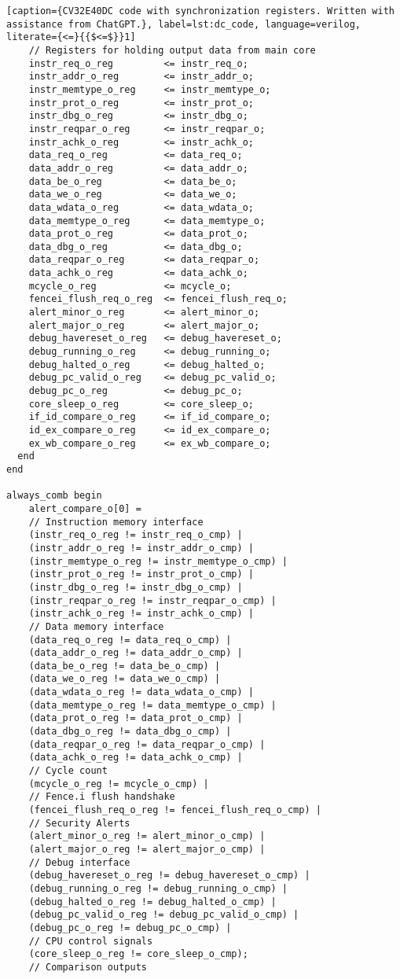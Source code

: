 \begin{lstlisting}[caption={CV32E40DC code with synchronization registers. Written with assistance from ChatGPT.}, label=lst:dc_code, language=verilog, literate={<=}{{$<=$}}1]
    // Registers for holding output data from main core 
    instr_req_o_reg         <= instr_req_o;
    instr_addr_o_reg        <= instr_addr_o;
    instr_memtype_o_reg     <= instr_memtype_o;
    instr_prot_o_reg        <= instr_prot_o;
    instr_dbg_o_reg         <= instr_dbg_o;
    instr_reqpar_o_reg      <= instr_reqpar_o;
    instr_achk_o_reg        <= instr_achk_o;
    data_req_o_reg          <= data_req_o;
    data_addr_o_reg         <= data_addr_o;
    data_be_o_reg           <= data_be_o;
    data_we_o_reg           <= data_we_o;
    data_wdata_o_reg        <= data_wdata_o;
    data_memtype_o_reg      <= data_memtype_o;
    data_prot_o_reg         <= data_prot_o;
    data_dbg_o_reg          <= data_dbg_o;
    data_reqpar_o_reg       <= data_reqpar_o;
    data_achk_o_reg         <= data_achk_o;
    mcycle_o_reg            <= mcycle_o;
    fencei_flush_req_o_reg  <= fencei_flush_req_o;
    alert_minor_o_reg       <= alert_minor_o;
    alert_major_o_reg       <= alert_major_o;
    debug_havereset_o_reg   <= debug_havereset_o;
    debug_running_o_reg     <= debug_running_o;
    debug_halted_o_reg      <= debug_halted_o;
    debug_pc_valid_o_reg    <= debug_pc_valid_o;
    debug_pc_o_reg          <= debug_pc_o;
    core_sleep_o_reg        <= core_sleep_o;
    if_id_compare_o_reg     <= if_id_compare_o;
    id_ex_compare_o_reg     <= id_ex_compare_o;
    ex_wb_compare_o_reg     <= ex_wb_compare_o;
  end 
end

always_comb begin
    alert_compare_o[0] = 
    // Instruction memory interface
    (instr_req_o_reg != instr_req_o_cmp) |
    (instr_addr_o_reg != instr_addr_o_cmp) |
    (instr_memtype_o_reg != instr_memtype_o_cmp) |
    (instr_prot_o_reg != instr_prot_o_cmp) |
    (instr_dbg_o_reg != instr_dbg_o_cmp) |
    (instr_reqpar_o_reg != instr_reqpar_o_cmp) |
    (instr_achk_o_reg != instr_achk_o_cmp) |
    // Data memory interface
    (data_req_o_reg != data_req_o_cmp) |
    (data_addr_o_reg != data_addr_o_cmp) |
    (data_be_o_reg != data_be_o_cmp) |
    (data_we_o_reg != data_we_o_cmp) |
    (data_wdata_o_reg != data_wdata_o_cmp) |
    (data_memtype_o_reg != data_memtype_o_cmp) |
    (data_prot_o_reg != data_prot_o_cmp) |
    (data_dbg_o_reg != data_dbg_o_cmp) |
    (data_reqpar_o_reg != data_reqpar_o_cmp) |
    (data_achk_o_reg != data_achk_o_cmp) |
    // Cycle count
    (mcycle_o_reg != mcycle_o_cmp) |
    // Fence.i flush handshake
    (fencei_flush_req_o_reg != fencei_flush_req_o_cmp) |
    // Security Alerts
    (alert_minor_o_reg != alert_minor_o_cmp) |
    (alert_major_o_reg != alert_major_o_cmp) |
    // Debug interface
    (debug_havereset_o_reg != debug_havereset_o_cmp) |
    (debug_running_o_reg != debug_running_o_cmp) |
    (debug_halted_o_reg != debug_halted_o_cmp) |
    (debug_pc_valid_o_reg != debug_pc_valid_o_cmp) |
    (debug_pc_o_reg != debug_pc_o_cmp) |
    // CPU control signals
    (core_sleep_o_reg != core_sleep_o_cmp);
    // Comparison outputs
    

\end{lstlisting}
